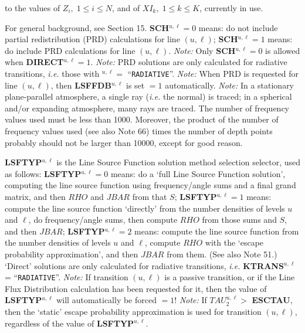 to the values of $Z_i, \; 1 \leq i \leq N$, and of $XI_k, \; 1 \leq k \leq K$,
currently in use.
\ej
\centerline{}
\space \noindent
For general background, see Section 15. \np
{\bf SCH}$^{u,\ell} = 0$ means: do not include partial redistribution (PRD)
calculations for line $(u,\ell)$; \np
{\bf SCH}$^{u,\ell} = 1$ means: do include PRD calculations for line $(u,\ell)$. \np
{\it Note:} Only {\bf SCH}$^{u,\ell} = 0$ is allowed when {\bf DIRECT}$^{u,\ell} = 1$. \np
{\it Note:} PRD solutions are only calculated for radiative transitions, {\it i.e.}
those with $^{u,\ell} = $ ``{\tt RADIATIVE}''. \np
{\it Note:} When PRD is requested for line $(u,\ell)$, then {\bf LSFFDB}$^{u,\ell}$
is set $= 1$ automatically. \np
{\it Note:} In a stationary plane-parallel atmosphere, a single ray 
({\it i.e.} the normal) is traced; in a spherical and/or expanding atmosphere,
many rays are traced. The number of frequency values used must be less 
than 1000. Moreover, the product of the number of frequency values used
(see also Note 66) times the number of depth points probably should not be
larger than 10000, except for good reason.
\blankline
\blankline
\centerline{}
\space \noindent
{\bf LSFTYP}$^{u,\ell}$ is the Line Source Function solution method selection
selector, used as follows: \np
{\bf LSFTYP}$^{u,\ell} = 0$ means: do a `full Line Source Function solution',
computing the line source function using frequency/angle sums and a final
grand matrix, and then $RHO$ and $JBAR$ from that $S$; \np
{\bf LSFTYP}$^{u,\ell} = 1$ means: compute the 
line source function `directly' from the number
densities of levels $u$ and $\ell$, do frequency/angle sums, then compute
$RHO$ from those sums and $S$, and then $JBAR$; \np
{\bf LSFTYP}$^{u,\ell} = 2$ means: compute the line source function from the
number densities of levels $u$ and $\ell$, compute $RHO$ with the
`escape probability approximation', and then $JBAR$ from them. 
(See also Note 51.) \np
`Direct' solutions are only calculated for radiative transitions,
{\it i.e.} {\bf KTRANS}$^{u,\ell}$ = ``{\tt RADIATIVE}''. \np
{\it Note:} 
If transition $(u,\ell)$ is a passive transition, or if the
Line Flux Distribution calculation has been requested for it, then the
value of {\bf LSFTYP}$^{u,\ell}$ will automatically be forced $= 1$! \np
{\it Note:} 
If $TAU^{u,\ell}_2 > $ {\bf ESCTAU}, then the `static'
escape probability approximation is used for transition $(u,\ell)$,
regardless of the value of {\bf LSFTYP}$^{u,\ell}$.
